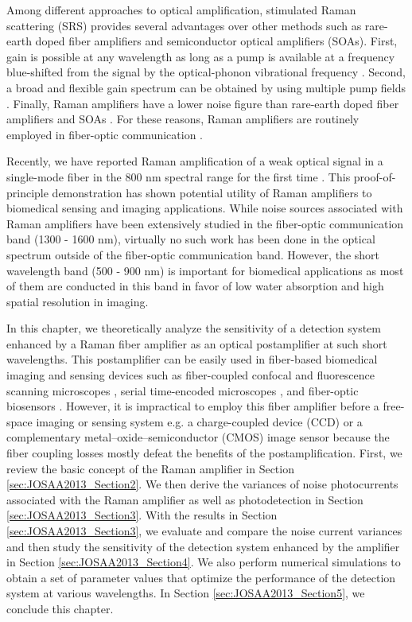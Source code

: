 Among different approaches to optical amplification, stimulated Raman scattering (SRS) \cite{agrawal2007nonlinear,islam2002raman} provides several advantages over other methods such as rare-earth doped fiber amplifiers and semiconductor optical amplifiers (SOAs). First, gain is possible at any wavelength as long as a pump is available at a frequency blue-shifted from the signal by the optical-phonon vibrational frequency \cite{agrawal2007nonlinear}. Second, a broad and flexible gain spectrum can be obtained by using multiple pump fields \cite{islam2002raman}. Finally, Raman amplifiers have a lower noise figure than rare-earth doped fiber amplifiers and SOAs \cite{islam2002raman,goda2009demonstration}. For these reasons, Raman amplifiers are routinely employed in fiber-optic communication \cite{islam2002raman}.

Recently, we have reported Raman amplification of a weak optical signal in a single-mode fiber in the 800 nm spectral range for the first time \cite{goda2009demonstration,mahjoubfar2010raman}. This proof-of-principle demonstration has shown potential utility of Raman amplifiers to biomedical sensing and imaging applications. While noise sources associated with Raman amplifiers have been extensively studied in the fiber-optic communication band (1300 - 1600 nm), virtually no such work has been done in the optical spectrum outside of the fiber-optic communication band. However, the short wavelength band (500 - 900 nm) is important for biomedical applications as most of them are conducted in this band in favor of low water absorption and high spatial resolution in imaging.

In this chapter, we theoretically analyze the sensitivity of a detection system enhanced by a Raman fiber amplifier as an optical postamplifier at such short wavelengths. This postamplifier can be easily used in fiber-based biomedical imaging and sensing devices such as fiber-coupled confocal and fluorescence scanning microscopes \cite{bird2002compact,kimura1991confocal}, serial time-encoded microscopes \cite{goda2009serial,tsia2010performance,goda2012hybrid,mahjoubfar2013label}, and fiber-optic biosensors \cite{wolfbeis2004fiber,song2006refractive,piliarik2003surface}. However, it is impractical to employ this fiber amplifier before a free-space imaging or sensing system e.g. a charge-coupled device (CCD) or a complementary metal–oxide–semiconductor (CMOS) image sensor because the fiber coupling losses mostly defeat the benefits of the postamplification. First, we review the basic concept of the Raman amplifier in Section \ref{sec:JOSAA2013_Section2}. We then derive the variances of noise photocurrents associated with the Raman amplifier as well as photodetection in Section \ref{sec:JOSAA2013_Section3}. With the results in Section \ref{sec:JOSAA2013_Section3}, we evaluate and compare the noise current variances and then study the sensitivity of the detection system enhanced by the amplifier in Section \ref{sec:JOSAA2013_Section4}. We also perform numerical simulations to obtain a set of parameter values that optimize the performance of the detection system at various wavelengths. In Section \ref{sec:JOSAA2013_Section5}, we conclude this chapter.

